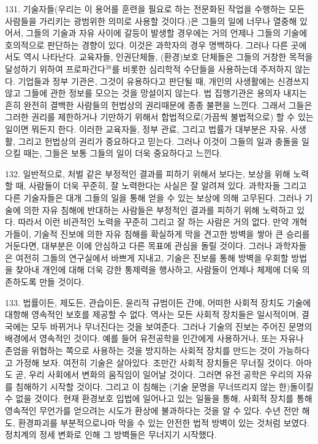 \documentclass[11pt,a4paper]{article}
\begin{document}
\begin{multicols}{2}
131. 기술자들(우리는 이 용어를 훈련을 필요로 하는 전문화된 작업을 수행하는 모든 사람들을 가리키는  광범위한 의미로 사용할 것이다.)은 그들의 일에 너무나 열중해 있어서, 그들의 기술과 자유 사이에  갈등이 발생할 경우에는 거의 언제나 그들의 기술에 호의적으로 판단하는 경향이 있다. 이것은 과학자의  경우 명백하다. 그러나 다른 곳에서도 역시 나타난다. 교육자들, 인권단체들, (환경)보호 단체들은 그들의 거창한 목적을 달성하기 위하여 프로파간다\hyperlink{38}{$^{38}$}를 비롯한 심리학적 수단들을 사용하는데 주저하지 않는다.  기업들과 정부 기관은, 그것이 유용하다고 판단될 때, 개인의 사생활에는 신경쓰지 않고 그들에 관한  정보를 모으는 것을 망설이지 않는다. 법 집행기관은 용의자 내지는 흔히 완전히 결백한 사람들의  헌법상의 권리때문에 종종 불편을 느낀다. 그래서 그들은 그러한 권리를 제한하거나 기만하기 위해서  합법적으로(가끔씩 불법적으로) 할 수 있는 일이면 뭐든지 한다. 이러한 교육자들, 정부 관료, 그리고  법률가 대부분은 자유, 사생활, 그리고 헌법상의 권리가 중요하다고 믿는다. 그러나 이것이 그들의 일과  충돌을 일으킬 때는, 그들은 보통 그들의 일이 더욱 중요하다고 느낀다. 


132. 일반적으로, 처벌 같은 부정적인 결과를 피하기 위해서 보다는, 보상을 위해 노력할 때, 사람들이  더욱 꾸준히, 잘 노력한다는 사실은 잘 알려져 있다. 과학자들 그리고 다른 기술자들은 대개 그들의 일을  통해 얻을 수 있는 보상에 의해 고무된다. 그러나 기술에 의한 자유 침해에 반대하는 사람들은 부정적인  결과를 피하기 위해 노력하고 있다. 따라서 이런 비관적인 노력을 꾸준히 그리고 잘 하는 사람은 거의  없다. 만약 개혁가들이, 기술적 진보에 의한 자유 침해를 확실하게 막을 견고한 방벽을 쌓아 큰 승리를  거둔다면, 대부분은 이에 안심하고 다른 목표에 관심을 돌릴 것이다. 그러나 과학자들은 여전히 그들의  연구실에서 바쁘게 지내고, 기술은 진보를 통해 방벽을 우회할 방법을 찾아내 개인에 대해 더욱 강한  통제력을 행사하고, 사람들이 언제나 체제에 더욱 의존하도록 만들 것이다. 


133. 법률이든, 제도든, 관습이든, 윤리적 규범이든 간에, 어떠한 사회적 장치도 기술에 대항해 영속적인  보호를 제공할 수 없다. 역사는 모든 사회적 장치들은 일시적이며, 결국에는 모두 바뀌거나 무너진다는  것을 보여준다. 그러나 기술의 진보는 주어진 문명의 배경에서 영속적인 것이다. 예를 들어 유전공학을  인간에게 사용하거나, 또는 자유나 존엄을 위협하는 쪽으로 사용하는 것을 방지하는 사회적 장치를  만드는 것이 가능하다고 가정해 보자. 여전히 기술은 살아있다. 조만간 사회적 장치들은 무너질 것이다.  아마도 곧, 우리 사회에서 변화의 움직임이 일어날 것이다. 그러면 유전 공학은 우리의 자유를 침해하기  시작할 것이다. 그리고 이 침해는 (기술 문명을 무너뜨리지 않는 한)돌이킬 수 없을 것이다. 현재 환경보호 입법에 일어나고 있는 일들을 통해, 사회적 장치를 통해 영속적인 무언가를 얻으려는 시도가 환상에  불과하다는 것을 알 수 있다. 수년 전만 해도, 환경파괴를 부분적으로나마 막을 수 있는 안전한 법적  방벽이 있는 것처럼 보였다. 정치계의 정세 변화로 인해 그 방벽들은 무너지기 시작했다. 



\end{multicols}
\end{document}

